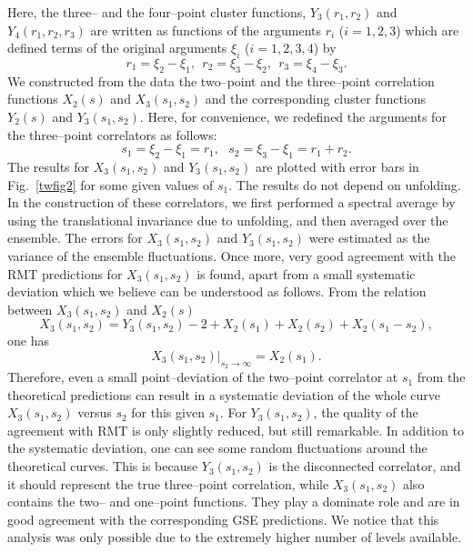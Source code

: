 Here, the three-- and the four--point cluster functions,
$Y_3(r_1,r_2)$ and $Y_4(r_1,r_2,r_3)$ are written as functions of the
arguments $r_i$ ($i=1,2,3$) which are defined terms of the original
arguments $\xi_i$ ($i=1,2,3,4$) by
\begin{equation}
  r_1=\xi_2-\xi_1, \ \ r_2=\xi_3-\xi_2, \ \ r_3=\xi_4-\xi_3.
\label{arg1}
\end{equation}
We constructed from the data the two--point and the three--point
correlation functions $X_2(s)$ and $X_3(s_1,s_2)$ and the
corresponding cluster functions $Y_2(s)$ and $Y_3(s_1,s_2)$. Here, for
convenience, we redefined the arguments for the three--point
correlators as follows:
\begin{equation}
s_1=\xi_2-\xi_1=r_1, \ \ \ s_2=\xi_3-\xi_1=r_1+r_2.
\end{equation}
The results for $X_3(s_1,s_2)$ and $Y_3(s_1,s_2)$ are plotted with
error bars in Fig.~\ref{twfig2} for some given values of $s_1$.  The
results do not depend on unfolding.  In the construction of these
correlators, we first performed a spectral average by using the
translational invariance due to unfolding, and then averaged over the
ensemble. The errors for $X_3(s_1,s_2)$ and $Y_3(s_1,s_2)$ were
estimated as the variance of the ensemble fluctuations.  Once more,
very good agreement with the RMT predictions for $X_3(s_1,s_2)$ is
found, apart from a small systematic deviation which we believe can be
understood as follows. {}From the relation between $X_3(s_1,s_2)$ and
$X_2(s)$
\begin{equation}
X_3(s_1,s_2)=Y_3(s_1,s_2)-2+X_2(s_1)+X_2(s_2)+X_2(s_1-s_2),
\end{equation}
one has
\begin{equation}
X_3(s_1,s_2)|_{s_2\to \infty} = X_2(s_1).
\end{equation}
Therefore, even a small point--deviation of the two--point correlator
at $s_1$ from the theoretical predictions can result in a systematic
deviation of the whole curve $X_3(s_1,s_2)$ versus $s_2$ for this
given $s_1$.  For $Y_3(s_1,s_2)$, the quality of the agreement with
RMT is only slightly reduced, but still remarkable.  In addition to
the systematic deviation, one can see some random fluctuations around
the theoretical curves.  This is because $Y_3(s_1,s_2)$ is the
disconnected correlator, and it should represent the true three--point
correlation, while $X_3(s_1,s_2)$ also contains the two-- and
one--point functions. They play a dominate role and are in good
agreement with the corresponding GSE predictions. We notice that this
analysis was only possible due to the extremely higher number of
levels available.



